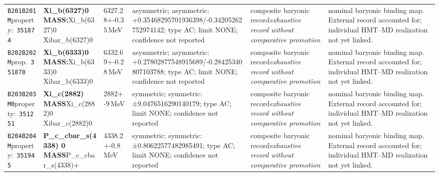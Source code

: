\begin{landscape}
\begin{longtable}{L{1.85cm}L{4.45cm}L{2.35cm}L{4.05cm}L{3.35cm}L{7.15cm}}
\texttt{B201}\newline \texttt{B201M}\newline property:\ \texttt{351874} & \textbf{Xi\_\allowbreak{}b(6327)0 MASS:}\newline Xi\_\allowbreak{}b(6327)0 \textbar{}\allowbreak{} Xibar\_\allowbreak{}b(6327)0 & 6327.28+-0.35\,MeV & asymmetric; asymmetric: +0.35468295701936398/-0.34205262752974142; type AC; limit NONE; confidence not reported & composite baryonic record\newline \emph{exhaustive record without comparative promotion} & nominal baryonic binding map. External record accounted for; individual HMT--MD realization not yet linked. \\
\texttt{B202}\newline \texttt{B202M}\newline prop.\ \texttt{351878} & \textbf{Xi\_\allowbreak{}b(6333)0 MASS:}\newline Xi\_\allowbreak{}b(6333)0 \textbar{}\allowbreak{} Xibar\_\allowbreak{}b(6333)0 & 6332.69+-0.28\,MeV & asymmetric; asymmetric: +0.27802877548915689/-0.28425340807103788; type AC; limit NONE; confidence not reported & composite baryonic record\newline \emph{exhaustive record without comparative promotion} & nominal baryonic binding map. External record accounted for; individual HMT--MD realization not yet linked. \\
\texttt{B203}\newline \texttt{B203M0}\newline property:\ \texttt{351251} & \textbf{Xi\_\allowbreak{}c(2882) MASS}\newline Xi\_\allowbreak{}c(2882)0 \textbar{}\allowbreak{} Xibar\_\allowbreak{}c(2882)0 & 2882+-9\,MeV & symmetric; symmetric: ±9.0476516290140179; type AC; limit NONE; confidence not reported & composite baryonic record\newline \emph{exhaustive record without comparative promotion} & nominal baryonic binding map. External record accounted for; individual HMT--MD realization not yet linked. \\
\texttt{B204}\newline \texttt{B204M}\newline property:\ \texttt{351945} & \textbf{P\_\allowbreak{}c\_\allowbreak{}cbar\_\allowbreak{}s(4338) 0 MASS}\newline P\_\allowbreak{}c\_\allowbreak{}cbar\_\allowbreak{}s(4338)+ & 4338.2+-0.8\,MeV & symmetric; symmetric: ±0.80622577482985491; type AC; limit NONE; confidence not reported & composite baryonic record\newline \emph{exhaustive record without comparative promotion} & nominal baryonic binding map. External record accounted for; individual HMT--MD realization not yet linked. \\

\end{longtable}
\end{landscape}
